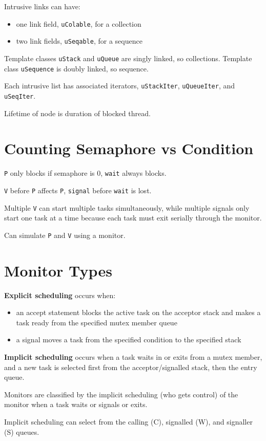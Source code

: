 \documentclass[11pt]{article}
\begin{document}
Intrusive links can have:
\begin{itemize}
\item one link field, \texttt{uColable}, for a collection
\item two link fields, \texttt{uSeqable}, for a sequence
\end{itemize}

Template classes \texttt{uStack} and \texttt{uQueue} are singly linked, so collections.
Template class \texttt{uSequence} is doubly linked, so sequence.

Each intrusive list has associated iterators, \texttt{uStackIter}, \texttt{uQueueIter}, and \texttt{uSeqIter}.

Lifetime of node is duration of blocked thread.
\section{Counting Semaphore vs Condition}
\label{sec:org4d68047}
\texttt{P} only blocks if semaphore is 0, \texttt{wait} always blocks.

\texttt{V} before \texttt{P} affects \texttt{P}, \texttt{signal} before \texttt{wait} is lost.

Multiple \texttt{V} can start multiple tasks simultaneously, while multiple signals only start one task at a
time because each task must exit serially through the monitor.

Can simulate \texttt{P} and \texttt{V} using a monitor.
\section{Monitor Types}
\label{sec:org2bba54b}
\textbf{Explicit scheduling} occurs when:
\begin{itemize}
\item an accept statement blocks the active task on the acceptor stack and makes a task ready from the
specified mutex member queue
\item a signal moves a task from the specified condition to the specified stack
\end{itemize}

\textbf{Implicit scheduling} occurs when a task waits in or exits from a mutex member, and a new task is
selected first from the acceptor/signalled stack, then the entry queue.

Monitors are classified by the implicit scheduling (who gets control) of the monitor when a task waits
or signals or exits.

Implicit scheduling can select from the calling (C), signalled (W), and signaller (S) queues.
\end{document}
